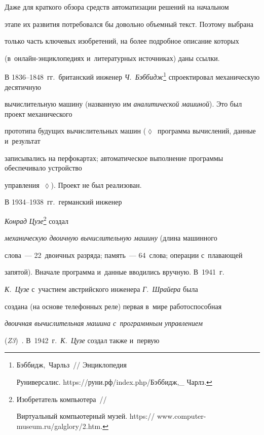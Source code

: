   Даже для краткого обзора средств автоматизации решений на начальном 


этапе их развития по\-тре\-бо\-вал\-ся бы довольно объемный текст. Поэтому выбрана 


только часть ключевых изобретений, на более подробное описание которых  


(в~он\-лайн-эн\-цикло\-пе\-ди\-ях и~литературных источниках) даны \mbox{ссылки}.


  


В 1836--1848~гг.\ британский инженер \textit{Ч.~Бэббидж}\footnote[4]{Бэббидж,~Чарльз~/\!\!/ Энциклопедия 


Руниверсалис. {\sf https://руни.рф/index.php/Бэббидж,\_ Чарлз}.} спроектировал механическую десятичную 


вы\-чис\-ли\-тель\-ную машину (названную им \textit{аналитической машиной}). Это был проект механического 


прототипа будущих вы\-чис\-ли\-тель\-ных машин ($\lozenge$~про\-грам\-ма вы\-чис\-ле\-ний, данные и~результат 


записывались на перфокартах; автоматическое выполнение про\-грам\-мы обеспечивало устройство 


управ\-ле\-ния~$\lozenge$). Проект не был реализован. 


  


  В 1934--1938~гг.\ германский инженер 


\textit{Конрад Цузе}\footnote[5]{ Изобретатель компьютера~/\!\!/ 


Виртуальный компьютерный музей. {\sf https:// www.computer-museum.ru/galglory/2.htm}.} создал 


\textit{механическую двоичную вы\-чис\-ли\-тель\-ную машину} (длина машинного 


слова~--- 22~двоичных разряда; память~--- 64~слова; операции с~пла\-ва\-ющей 


запятой). Вначале программа и~данные вводились вруч\-ную. В~1941~г.\ 


\textit{К.~Цузе} с~участием австрийского инженера \textit{Г.~Шрайера} была 


создана (на основе телефонных реле) первая в~мире работоспособная 


\textit{двоичная вы\-чис\-ли\-тель\-ная машина с~программным управ\-ле\-ни\-ем} 


(\textit{Z3})~\cite{6-il}. В~1942~г.\ \textit{К.~Цузе} создал так\-же и~пер\-вую 


